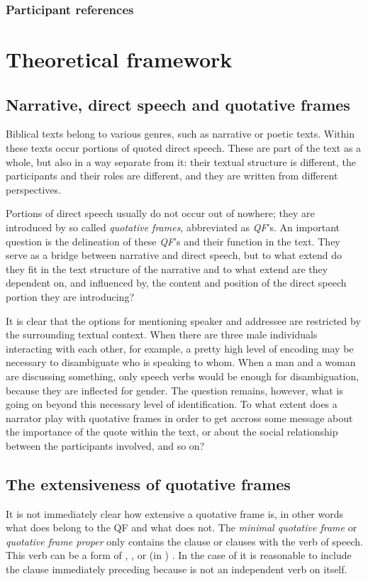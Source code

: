 \documentclass[twoside,a4paper,10pt]{article}
\newcommand{\hebr}[1]{\cjRL{#1}}
\newcommand{\mi}[1]{\emph{#1}}
\begin{document}
\subsubsection{Participant references}

\section{Theoretical framework}
\subsection{Narrative, direct speech and quotative frames}
Biblical texts belong to various genres, such as narrative or poetic texts. Within these texts occur portions of quoted direct speech. These are part of the text as a whole, but also in a way separate from it: their textual structure is different, the participants and their roles are different, and they are written from different perspectives.

Portions of direct speech usually do not occur out of nowhere; they are introduced by so called \mi{quotative frames}, abbreviated as \mi{QF}'s. An important question is the delineation of these \mi{QF}'s and their function in the text. They serve as a bridge between narrative and direct speech, but to what extend do they fit in the text structure of the narrative and to what extend are they dependent on, and influenced by, the content and position of the direct speech portion they are introducing?

It is clear that the options for mentioning speaker and addressee are restricted by the surrounding textual context. When there are three male individuals interacting with each other, for example, a pretty high level of encoding may be necessary to disambiguate who is speaking to whom. When a man and a woman are discussing something, only speech verbs would be enough for disambiguation, because they are inflected for gender. The question remains, however, what is going on beyond this necessary level of identification. To what extent does a narrator play with quotative frames in order to get accross some message about the importance of the quote within the text, or about the social relationship between the participants involved, and so on?

\subsection{The extensiveness of quotative frames}
It is not immediately clear how extensive a quotative frame is, in other words what does belong to the QF and what does not. The \mi{minimal quotative frame} or \mi{quotative frame proper} only contains the clause or clauses with the verb of speech. This verb can be a form of \hebr{>MR}, \hebr{DBR}, or (in ) \hebr{MLL}. In the case of \hebr{L>MR} it is reasonable to include the clause immediately preceding \hebr{L>MR} because \hebr{L>MR} is not an independent verb on itself.
\end{document}
